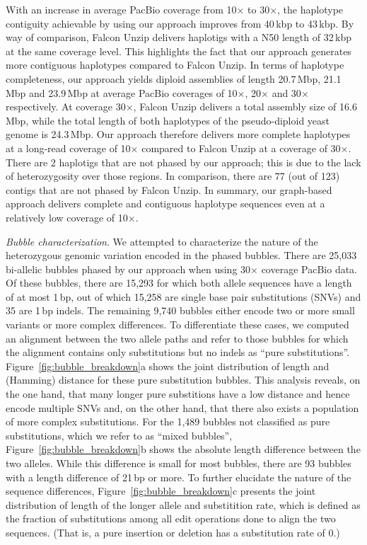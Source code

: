 With an increase in average PacBio coverage from 10$\times$ to 30$\times$, the haplotype contiguity achievable by using our approach improves from 40\,kbp to 43\,kbp.
By way of comparison, Falcon Unzip delivers haplotigs with a N50 length of 32\,kbp at the same coverage level. This highlights the fact that our approach generates more contiguous haplotypes compared to Falcon Unzip.
In terms of haplotype completeness, our approach yields diploid assemblies of length 20.7\,Mbp, 21.1\,Mbp and 23.9\,Mbp at average PacBio coverages of 10$\times$, 20$\times$ and 30$\times$ respectively.
At coverage 30$\times$, Falcon Unzip delivers a total assembly size of 16.6\,Mbp, while the total length of both haplotypes of the pseudo-diploid yeast genome is 24.3\,Mbp.
Our approach therefore delivers more complete haplotypes at a long-read coverage of 10$\times$ compared to Falcon Unzip at a coverage of 30$\times$.
There are 2 haplotigs that are not phased by our approach; this is due to the lack of heterozygosity over those regions.
In comparison, there are 77 (out of 123) contigs that are not phased by Falcon Unzip.
In summary, our graph-based approach delivers complete and contiguous haplotype sequences even at a relatively low coverage of 10$\times$.

\textit{Bubble characterization}.
We attempted to characterize the nature of the heterozygous genomic variation encoded in the phased bubbles.
There are 25,033 bi-allelic bubbles phased by our approach when using 30$\times$ coverage PacBio data.
Of these bubbles, there are 15,293 for which both allele sequences have a length of at most 1\,bp, out of which 15,258 are single base pair substitutions (SNVs) and 35 are 1\,bp indels.
The remaining 9,740 bubbles either encode two or more small variants or more complex differences.
To differentiate these cases, we computed an alignment between the two allele paths and refer to those bubbles for which the alignment contains only substitutions but no indels as ``pure substitutions''.
Figure~\ref{fig:bubble_breakdown}a shows the joint distribution of length and (Hamming) distance for these pure substitution bubbles.
This analysis reveals, on the one hand, that many longer pure substitions have a low distance and hence encode multiple SNVs and, on the other hand, that there also exists a population of more complex substitutions.
For the 1,489 bubbles not classified as pure substitutions, which we refer to as ``mixed bubbles'', Figure~\ref{fig:bubble_breakdown}b shows the absolute length difference between the two alleles.
While this difference is small for most bubbles, there are 93 bubbles with a length difference of 21\,bp or more.
To further elucidate the nature of the sequence differences, Figure~\ref{fig:bubble_breakdown}c presents the joint distribution of length of the longer allele and substitition rate, which is defined as the fraction of substitutions among all edit operations done to align the two sequences. (That is, a pure insertion or deletion has a substitution rate of 0.)

